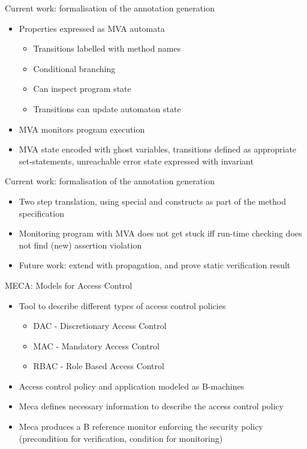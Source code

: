 \documentclass[final,nocolorBG,a4,marieke,nototal,ps, accumulate,slideColor]{prosper}
\begin{document}
\begin{slide}{Current work: formalisation of the annotation
generation}
\begin{itemize}
\item Properties expressed as MVA automata
\begin{itemize}
\item Transitions labelled with method names
\item Conditional branching
\item Can inspect program state
\item Transitions can update automaton state
\end{itemize}
\item MVA monitors program execution
\item MVA state encoded with ghost variables, transitions defined as
appropriate set-statements, unreachable error state expressed with
invariant
\end{itemize}
\end{slide}


\begin{slide}{Current work: formalisation of the annotation
generation}
\begin{itemize}
\item Two step translation, using special  and
 constructs as part of the method specification
\item Monitoring program with MVA does not get stuck iff run-time
checking does not find (new) assertion violation
\item Future work: extend with propagation, and prove static
verification result
\end{itemize}
\end{slide}


\begin{slide}{MECA: Models for Access Control}
\begin{itemize}
\item Tool to describe different types of access control policies 
\begin{itemize}
\item DAC - Discretionary Access Control
\item MAC - Mandatory Access Control  
\item RBAC - Role Based Access Control
\end{itemize}


\item Access control policy and application modeled as B-machines
\item Meca defines necessary information to describe the
access control policy
\item Meca produces a B reference monitor enforcing the security policy 
(precondition for verification, condition for monitoring)
\end{itemize}
\end{slide}
\end{document}
